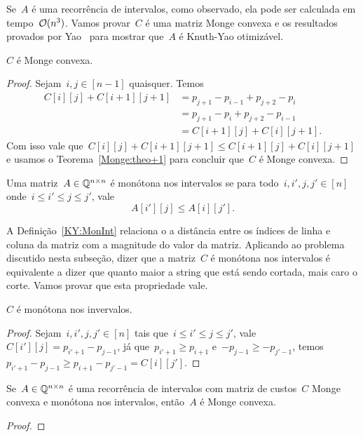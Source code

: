 Se~$A$ é uma recorrência de intervalos, como observado, ela pode ser calculada em tempo~$\mathcal{O}(n^3)$. Vamos provar~$C$ é uma matriz Monge convexa e os resultados provados por Yao~\cite{Yao:1980} para mostrar que~$A$ é Knuth-Yao otimizável.

\begin{prop}
$C$ é Monge convexa.
\end{prop}

\begin{proof}
Sejam~$i,j \in [n-1]$ quaisquer. Temos 
\begin{align*}
    C[i][j] + C[i+1][j+1] &= p_{j+1} - p_{i-1} + p_{j+2} - p_{i} \\
                          &= p_{j+1} - p_{i} + p_{j+2} - p_{i-1} \\
                          &= C[i+1][j] + C[i][j+1] \text{.}
\end{align*}
Com isso vale que~$C[i][j] + C[i+1][j+1] \leq C[i+1][j] + C[i][j+1]$ e usamos o Teorema~\ref{Monge:theo+1} para concluir que~$C$ é Monge convexa.
\end{proof}

\begin{defi} \label{KY:MonInt}
Uma matriz~$A \in \mathbb{Q}^{n \times n}$ é monótona nos intervalos se para todo~$i,i',j,j' \in [n]$ onde~$i \leq i' \leq j \leq j'$, vale
$$A[i'][j] \leq A[i][j'] \text{.}$$
\end{defi}

A Definição~\ref{KY:MonInt} relaciona o a distância entre os índices de linha e coluna da matriz com a magnitude do valor da matriz. Aplicando ao problema discutido nesta subseção, dizer que a matriz~$C$ é monótona nos intervalos é equivalente a dizer que quanto maior a string que está sendo cortada, mais caro o corte. Vamos provar que esta propriedade vale.

\begin{prop}
$C$ é monótona nos invervalos.
\end{prop}

\begin{proof}
Sejam~$i,i',j,j' \in [n]$ tais que~$i \leq i' \leq j \leq j'$, vale~$C[i'][j] = p_{i'+1} - p_{j-1}$, já que~${p_{i'+1} \geq p_{i+1}}$ e~${-p_{j-1} \geq -p_{j'-1}}$, temos~$p_{i'+1} - p_{j-1} \geq p_{i+1} - p_{j'-1} = C[i][j']$.
\end{proof}

\begin{lema}
Se~$A \in \mathbb{Q}^{n \times n}$ é uma recorrência de intervalos com matriz de custos~$C$ Monge convexa e monótona nos intervalos, então~$A$ é Monge convexa.
\end{lema}

\begin{proof}

\end{proof}
